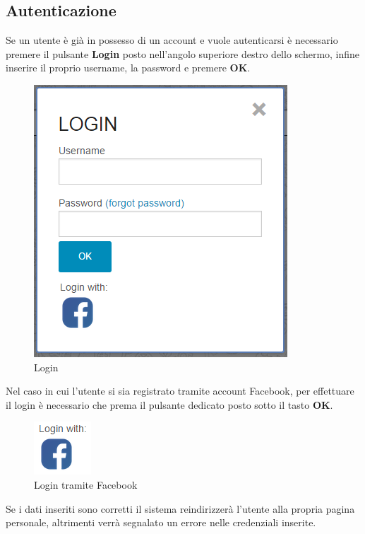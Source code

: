\subsection{Autenticazione}
Se un utente è già in possesso di un account e vuole autenticarsi è necessario premere il pulsante \textbf{Login} posto nell'angolo superiore destro dello schermo, infine inserire il proprio username, la password e premere \textbf{OK}.

\begin{figure}[h] 
	\centering 
	\includegraphics[scale=0.40] {img/login.png}
	\caption{Login} 
\end{figure}

\noindent Nel caso in cui l'utente si sia registrato tramite account Facebook, per effettuare il login è necessario che prema il pulsante dedicato posto sotto il tasto \textbf{OK}.

\begin{figure}[H] 
	\centering 
	\includegraphics[scale=0.40] {img/facelog.png}
	\caption{Login tramite Facebook} 
\end{figure}

\noindent Se i dati inseriti sono corretti il sistema reindirizzerà l'utente alla propria pagina personale, altrimenti verrà segnalato un errore nelle credenziali inserite.




